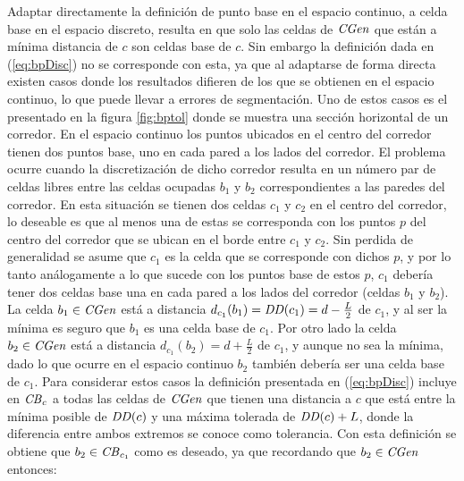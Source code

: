 
Adaptar directamente la definición de punto base en el espacio continuo, a
celda base en el espacio discreto, resulta en que solo las celdas de
$\mathit{CGen}$ que están a mínima distancia de $c$  son celdas base de $c$. Sin
embargo la definición dada en (\ref{eq:bpDisc}) no se corresponde con esta, ya
que al adaptarse de forma directa existen casos donde los resultados difieren
de los que se obtienen en el espacio continuo, lo que puede llevar a errores de
segmentación. 
Uno de estos casos es el presentado en la figura \ref{fig:bptol} donde se
muestra una sección horizontal de un corredor. En el espacio continuo los 
puntos ubicados en el centro del corredor tienen dos puntos base,
uno en cada pared a los lados del corredor.
El problema ocurre cuando la discretización de dicho corredor resulta en un
número par de celdas libres entre las celdas ocupadas $b_1$ y $b_2$ correspondientes a las
paredes del corredor. En esta situación se tienen dos celdas $c_1$ y $c_2$ en
el centro del corredor, lo deseable es que al menos una de estas se corresponda
con los puntos $p$ del centro del corredor que se ubican en el borde entre $c_1$ y $c_2$. Sin
perdida de generalidad se asume que $c_1$ es la celda que se corresponde con
dichos $p$, y por lo tanto análogamente a lo que sucede con los
puntos base de estos $p$, $c_1$ debería tener dos celdas base una en cada pared a los lados del
corredor (celdas $b_1$ y $b_2$).
La celda $b_1 \in \mathit{CGen}$ está a distancia $d_{c_1}(b_1) =
\mathit{DD}(c_1) = d-\frac{L}{2}$ de $c_1$, y al ser la mínima es seguro que $b_1$ es una celda base de
$c_1$. Por otro lado la celda $b_2 \in \mathit{CGen}$ está a distancia
$d_{c_1}(b_2) = d+\frac{L}{2}$ de $c_1$, y aunque no sea la mínima, dado lo
que ocurre en el espacio continuo $b_2$ también debería ser una celda base de $c_1$. Para
considerar estos casos la definición presentada en (\ref{eq:bpDisc}) incluye en
$\mathit{CB}_{c}$ a todas las celdas de $\mathit{CGen}$ que tienen una distancia a $c$
que está entre la mínima posible de $\mathit{DD}(c)$ y una máxima tolerada de
$\mathit{DD}(c)+L$, donde la diferencia entre ambos
extremos se conoce como tolerancia. Con esta definición se obtiene que $b_2 \in
\mathit{CB}_{c_1}$ como es deseado, ya que recordando que $b_2\in \mathit{CGen}$
entonces:

